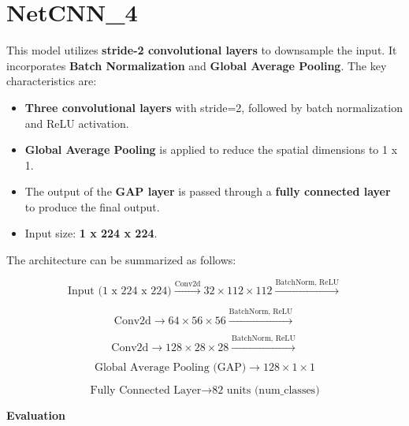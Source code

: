 \documentclass[12pt]{article}
\begin{document}
\section*{NetCNN\_4}
This model utilizes \textbf{stride-2 convolutional layers} to downsample the input. It incorporates \textbf{Batch Normalization} and \textbf{Global Average Pooling}. The key characteristics are:
\begin{itemize}
    \item \textbf{Three convolutional layers} with stride=2, followed by batch normalization and ReLU activation.
    \item \textbf{Global Average Pooling} is applied to reduce the spatial dimensions to 1 x 1.
    \item The output of the \textbf{GAP layer} is passed through a \textbf{fully connected layer} to produce the final output.
    \item Input size: \textbf{1 x 224 x 224}.
\end{itemize}

The architecture can be summarized as follows:

\[
\text{Input (1 x 224 x 224)} \xrightarrow{\text{Conv2d}} 32 \times 112 \times 112 \xrightarrow{\text{BatchNorm, ReLU}} 
\]

\[
\text{Conv2d} \rightarrow 64 \times 56 \times 56 \xrightarrow{\text{BatchNorm, ReLU}} 
\]

\[
\text{Conv2d} \rightarrow 128 \times 28 \times 28 \xrightarrow{\text{BatchNorm, ReLU}} 
\]

\[
\text{Global Average Pooling (GAP)} \rightarrow 128 \times 1 \times 1
\]

\[
\text{Fully Connected Layer} \rightarrow \text{82 units (num\_classes)}
\]

\textbf{Evaluation}
\end{document}
